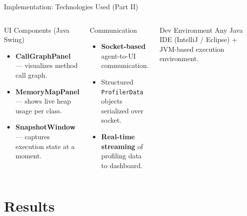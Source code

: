 \documentclass[aspectratio=169]{beamer}
\begin{document}
\begin{frame}{Implementation: Technologies Used (Part II)}
  \begin{columns}[T]
    
      \begin{block}{UI Components (Java Swing)}
        \begin{itemize}\normalsize\itemsep5pt
          \item \textbf{CallGraphPanel} — visualizes method call graph.
          \item \textbf{MemoryMapPanel} — shows live heap usage per class.
          \item \textbf{SnapshotWindow} — captures execution state at a moment.
        \end{itemize}
      \end{block}
    
      \begin{block}{Communication}
        \begin{itemize}\normalsize\itemsep5pt
          \item \textbf{Socket-based} agent-to-UI communication.
          \item Structured \texttt{ProfilerData} objects serialized over socket.
          \item \textbf{Real-time streaming} of profiling data to dashboard.
        \end{itemize}
      \end{block}
      
      \vspace{8pt}
      
      \begin{exampleblock}{Dev Environment}
        \normalsize Any Java IDE (IntelliJ / Eclipse) + JVM-based execution environment.
      \end{exampleblock}

  \end{columns}
\end{frame}

\section{Results}
\end{document}
